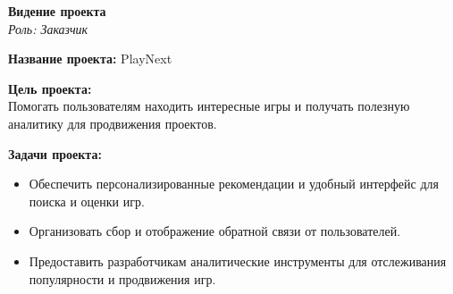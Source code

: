 \documentclass[a4paper,12pt]{article}
\begin{document}
\begin{center}
    {\Large \textbf{Видение проекта}}\\[5pt]
    \textit{Роль: Заказчик}\\[10pt]
\end{center}

\noindent\textbf{Название проекта:} PlayNext

\vspace{10pt}
\noindent\textbf{Цель проекта:}\\
Помогать пользователям находить интересные игры и получать полезную аналитику для продвижения проектов.

\vspace{10pt}
\noindent\textbf{Задачи проекта:}
\begin{itemize}[leftmargin=1.2cm]
    \item Обеспечить персонализированные рекомендации и удобный интерфейс для поиска и оценки игр.
    \item Организовать сбор и отображение обратной связи от пользователей.
    \item Предоставить разработчикам аналитические инструменты для отслеживания популярности и продвижения игр.
\end{itemize}
\end{document}
